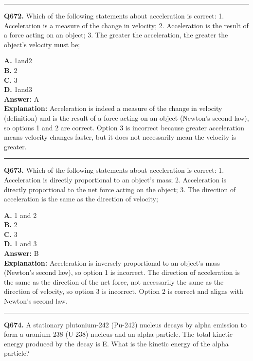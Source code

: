 \documentclass[12pt]{article}
\begin{document}
\hrule
\vspace{1em}


\noindent
\textbf{Q672.} Which of the following statements about acceleration is correct:
1.
Acceleration is a measure of the change in velocity;
2.
Acceleration is the result of a force acting on an object;
3.
The greater the acceleration, the greater the object's velocity must be;



\textbf{A.} 1and2 \\
\textbf{B.} 2 \\
\textbf{C.} 3 \\
\textbf{D.} 1and3 \\

\textbf{Answer:} A \\
\textbf{Explanation:} Acceleration is indeed a measure of the change in velocity (definition) and is the result of a force acting on an object (Newton's second law), so options 1 and 2 are correct. Option 3 is incorrect because greater acceleration means velocity changes faster, but it does not necessarily mean the velocity is greater.

\hrule
\vspace{1em}


\noindent
\textbf{Q673.} Which of the following statements about acceleration is correct:
1.
Acceleration is directly proportional to an object's mass;
2.
Acceleration is directly proportional to the net force acting on the object;
3.
The direction of acceleration is the same as the direction of velocity;



\textbf{A.} 1 and 2 \\
\textbf{B.} 2 \\
\textbf{C.} 3 \\
\textbf{D.} 1 and 3 \\

\textbf{Answer:} B \\
\textbf{Explanation:} Acceleration is inversely proportional to an object's mass (Newton's second law), so option 1 is incorrect. The direction of acceleration is the same as the direction of the net force, not necessarily the same as the direction of velocity, so option 3 is incorrect. Option 2 is correct and aligns with Newton's second law.

\hrule
\vspace{1em}


\noindent
\textbf{Q674.} A stationary plutonium-242 (Pu-242) nucleus decays by alpha emission to form a uranium-238 (U-238) nucleus and an alpha particle. The total kinetic energy produced by the decay is E.
What is the kinetic energy of the alpha particle?
\end{document}
